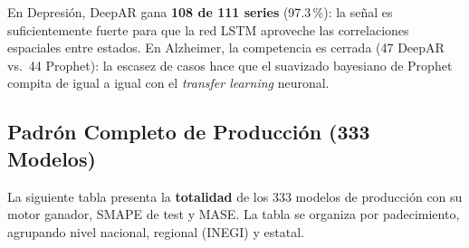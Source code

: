 \documentclass[12pt, letterpaper]{article}
\begin{document}
En Depresión, DeepAR gana \textbf{108 de 111 series} (97.3\,\%): la señal es suficientemente fuerte para que la red LSTM aproveche las correlaciones espaciales entre estados. En Alzheimer, la competencia es cerrada (47 DeepAR vs.\ 44 Prophet): la escasez de casos hace que el suavizado bayesiano de Prophet compita de igual a igual con el \textit{transfer learning} neuronal.

\subsection{Padrón Completo de Producción (333 Modelos)}

La siguiente tabla presenta la \textbf{totalidad} de los 333 modelos de producción con su motor ganador, SMAPE de test y MASE. La tabla se organiza por padecimiento, agrupando nivel nacional, regional (INEGI) y estatal.
\end{document}

